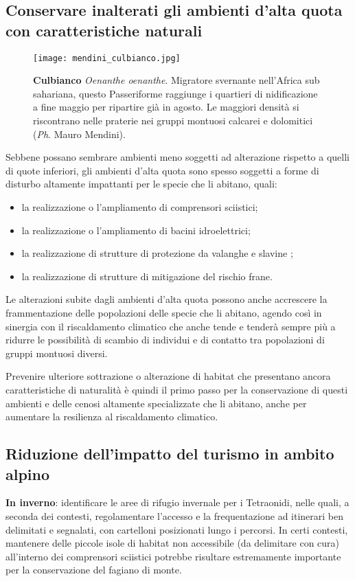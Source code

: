 \documentclass[10pt,twoside,openany,x11names,svgnames,italian,a5paper,dvipsnames,table]{memoir}
\newcommand{\ph}{\emph{Ph}. }
\begin{document}
\subsection{Conservare inalterati gli ambienti d'alta quota con caratteristiche naturali}
\begin{wrapfigure}[17]{r}{.5\columnwidth}
\centering
\vspace{-.4cm}
  \texttt{[image: mendini\_culbianco.jpg]}
  \caption*{\textbf{Culbianco} \emph{Oenanthe oenanthe}. Migratore svernante nell’Africa sub sahariana, questo Passeriforme raggiunge i quartieri di nidificazione a fine maggio per ripartire già in agosto. Le maggiori densità si riscontrano nelle praterie nei gruppi montuosi calcarei e dolomitici (\ph Mauro Mendini).}
\end{wrapfigure}Sebbene possano sembrare ambienti meno soggetti ad alterazione rispetto a quelli di quote inferiori, gli ambienti d’alta quota sono spesso soggetti a forme di disturbo altamente impattanti per le specie che li abitano, quali:
\begin{itemize}\itemsep0pt
  \item la realizzazione o l’ampliamento di comprensori sciistici;
  \item la realizzazione o l’ampliamento di bacini idroelettrici;
  \item la realizzazione di strutture di protezione da valanghe e slavine ;
  \item la realizzazione di strutture di mitigazione del rischio frane.
\end{itemize}

Le alterazioni subite dagli ambienti d'alta quota possono anche accrescere la frammentazione delle popolazioni delle specie che li abitano, agendo così in sinergia con il riscaldamento climatico che anche tende e tenderà sempre più a ridurre le possibilità di scambio di individui e di contatto tra popolazioni di gruppi montuosi diversi.

Prevenire ulteriore sottrazione o alterazione di habitat che presentano ancora caratteristiche di naturalità è quindi il primo passo per la conservazione di questi ambienti e delle cenosi altamente specializzate che li abitano, anche per aumentare la resilienza al riscaldamento climatico.

\subsection{Riduzione dell'impatto del turismo in ambito alpino}
\textbf{In inverno}: identificare le aree di rifugio invernale per i Tetraonidi, nelle quali, a seconda dei contesti, regolamentare l’accesso e la frequentazione ad itinerari ben delimitati e segnalati, con cartelloni posizionati lungo i percorsi. In certi contesti, mantenere delle piccole isole di habitat non accessibile (da delimitare con cura) all'interno dei comprensori sciistici potrebbe risultare estremamente importante per la conservazione del fagiano di monte.
\end{document}
